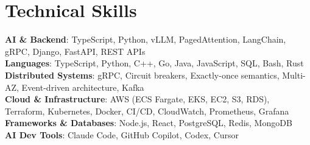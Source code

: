 \documentclass[letterpaper,11pt]{article}
\begin{document}
\section{Technical Skills}
\vspace{-7pt}
\begin{itemize}
[leftmargin=0.15in, label={}]\small{\item{
        \textbf{AI \& Backend}{: TypeScript, Python, vLLM, PagedAttention, LangChain, gRPC, Django, FastAPI, REST APIs} \\
        \textbf{Languages}{: TypeScript, Python, C++, Go, Java, JavaScript, SQL, Bash, Rust} \\
        \textbf{Distributed Systems}{: gRPC, Circuit breakers, Exactly-once semantics, Multi-AZ, Event-driven architecture, Kafka} \\
        \textbf{Cloud \& Infrastructure}{: AWS (ECS Fargate, EKS, EC2, S3, RDS), Terraform, Kubernetes, Docker, CI/CD, CloudWatch, Prometheus, Grafana} \\
        \textbf{Frameworks \& Databases}{: Node.js, React, PostgreSQL, Redis, MongoDB} \\
        \textbf{AI Dev Tools}{: Claude Code, GitHub Copilot, Codex, Cursor} \\
}}
\end{itemize}
\end{document}
